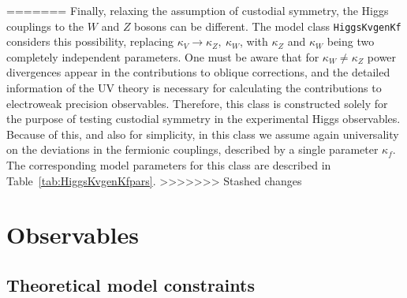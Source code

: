 \documentclass[preprint,3p,12pt]{elsarticle}
\begin{document}
=======
Finally, relaxing the assumption of custodial symmetry, the Higgs couplings to the $W$ and $Z$ bosons can be different. The model class {\tt HiggsKvgenKf} considers this possibility, replacing $\kappa_V\rightarrow \kappa_Z,~\kappa_W$, with $\kappa_Z$ and $\kappa_W$ being two completely independent parameters. One must be aware that for $\kappa_W\not = \kappa_Z$ power divergences appear in the contributions to oblique corrections, and the detailed information of the UV theory is necessary for calculating the contributions to electroweak precision observables.
Therefore, this class is constructed solely for the purpose of testing custodial symmetry in the experimental Higgs observables. Because of this, and also for simplicity, in this class we assume again universality on the deviations in the fermionic couplings, described by a single parameter $\kappa_f$. The corresponding model parameters for this class are described in Table~\ref{tab:HiggsKvgenKfpars}.
>>>>>>> Stashed changes

\section{Observables}
\label{sec:Observables}

\subsection{Theoretical model constraints}
\label{sec:theoryconstraints}






\end{document}
